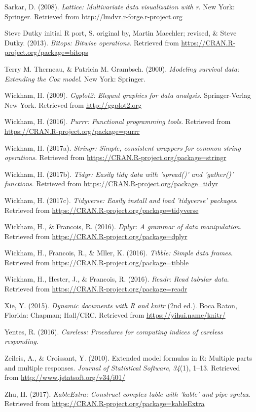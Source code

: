 \documentclass[english,man]{apa6}
\theoremstyle{definition}
\theoremstyle{definition}
\theoremstyle{remark}
\begin{document}
\hypertarget{ref-R-lattice}{}
Sarkar, D. (2008). \emph{Lattice: Multivariate data visualization with
r}. New York: Springer. Retrieved from
\url{http://lmdvr.r-forge.r-project.org}

\hypertarget{ref-R-bitops}{}
Steve Dutky initial R port, S. original by, Martin Maechler; revised, \&
Steve Dutky. (2013). \emph{Bitops: Bitwise operations}. Retrieved from
\url{https://CRAN.R-project.org/package=bitops}

\hypertarget{ref-R-survival-book}{}
Terry M. Therneau, \& Patricia M. Grambsch. (2000). \emph{Modeling
survival data: Extending the Cox model}. New York: Springer.

\hypertarget{ref-R-ggplot2}{}
Wickham, H. (2009). \emph{Ggplot2: Elegant graphics for data analysis}.
Springer-Verlag New York. Retrieved from \url{http://ggplot2.org}

\hypertarget{ref-R-purrr}{}
Wickham, H. (2016). \emph{Purrr: Functional programming tools}.
Retrieved from \url{https://CRAN.R-project.org/package=purrr}

\hypertarget{ref-R-stringr}{}
Wickham, H. (2017a). \emph{Stringr: Simple, consistent wrappers for
common string operations}. Retrieved from
\url{https://CRAN.R-project.org/package=stringr}

\hypertarget{ref-R-tidyr}{}
Wickham, H. (2017b). \emph{Tidyr: Easily tidy data with 'spread()' and
'gather()' functions}. Retrieved from
\url{https://CRAN.R-project.org/package=tidyr}

\hypertarget{ref-R-tidyverse}{}
Wickham, H. (2017c). \emph{Tidyverse: Easily install and load
'tidyverse' packages}. Retrieved from
\url{https://CRAN.R-project.org/package=tidyverse}

\hypertarget{ref-R-dplyr}{}
Wickham, H., \& Francois, R. (2016). \emph{Dplyr: A grammar of data
manipulation}. Retrieved from
\url{https://CRAN.R-project.org/package=dplyr}

\hypertarget{ref-R-tibble}{}
Wickham, H., Francois, R., \& Mller, K. (2016). \emph{Tibble: Simple
data frames}. Retrieved from
\url{https://CRAN.R-project.org/package=tibble}

\hypertarget{ref-R-readr}{}
Wickham, H., Hester, J., \& Francois, R. (2016). \emph{Readr: Read
tabular data}. Retrieved from
\url{https://CRAN.R-project.org/package=readr}

\hypertarget{ref-R-knitr}{}
Xie, Y. (2015). \emph{Dynamic documents with R and knitr} (2nd ed.).
Boca Raton, Florida: Chapman; Hall/CRC. Retrieved from
\url{https://yihui.name/knitr/}

\hypertarget{ref-R-careless}{}
Yentes, R. (2016). \emph{Careless: Procedures for computing indices of
careless responding.}

\hypertarget{ref-R-Formula}{}
Zeileis, A., \& Croissant, Y. (2010). Extended model formulas in R:
Multiple parts and multiple responses. \emph{Journal of Statistical
Software}, \emph{34}(1), 1--13. Retrieved from
\url{http://www.jstatsoft.org/v34/i01/}

\hypertarget{ref-R-kableExtra}{}
Zhu, H. (2017). \emph{KableExtra: Construct complex table with 'kable'
and pipe syntax}. Retrieved from
\url{https://CRAN.R-project.org/package=kableExtra}
\end{document}
